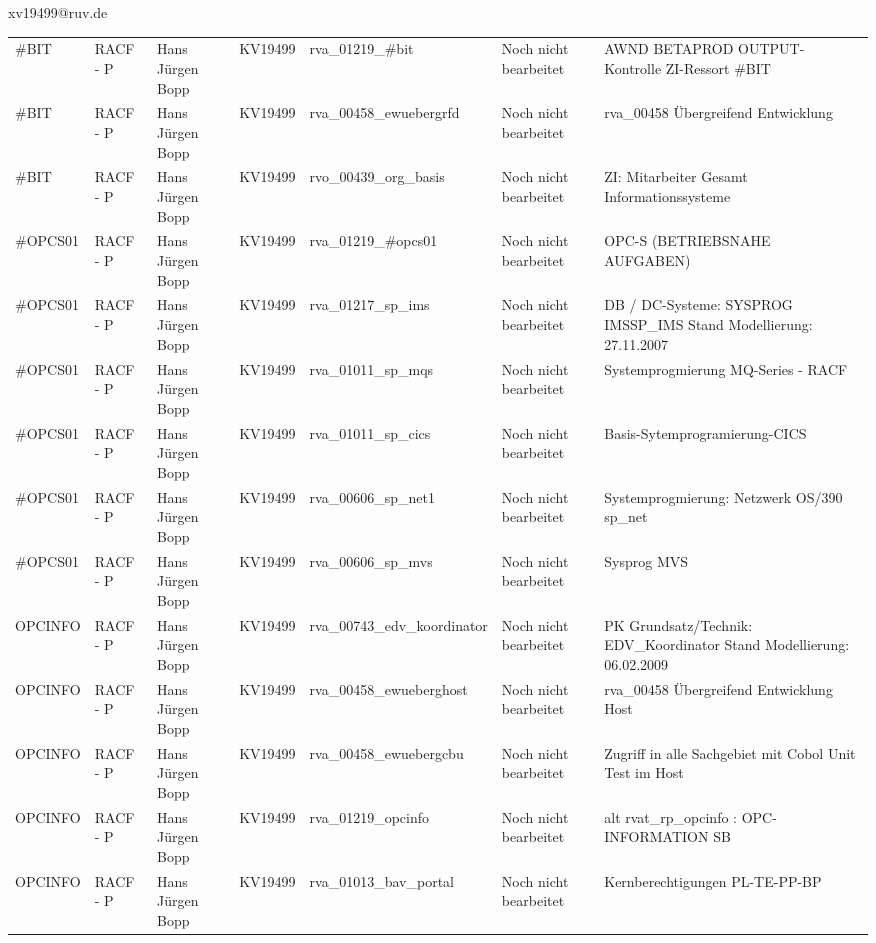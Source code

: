 \documentclass[a4paper,landscape,12pt]{letter}
\begin{document}
\begin{letter}{xv19499@ruv.de\hfill \break}
\begin{tiny}
\begin{longtable}{|p{35mm}|p{15mm}|p{25mm}|p{10mm}|p{40mm}|p{50mm}|p{50mm}|}
\#BIT & RACF - P & Hans Jürgen Bopp & KV19499 & rva\_01219\_\#bit & Noch nicht bearbeitet & AWND BETAPROD OUTPUT-Kontrolle ZI-Ressort \#BIT \\
\#BIT & RACF - P & Hans Jürgen Bopp & KV19499 & rva\_00458\_ewuebergrfd & Noch nicht bearbeitet & rva\_00458 Übergreifend Entwicklung \\
\#BIT & RACF - P & Hans Jürgen Bopp & KV19499 & rvo\_00439\_org\_basis & Noch nicht bearbeitet & ZI: Mitarbeiter Gesamt Informationssysteme \\
\#OPCS01 & RACF - P & Hans Jürgen Bopp & KV19499 & rva\_01219\_\#opcs01 & Noch nicht bearbeitet & OPC-S (BETRIEBSNAHE AUFGABEN) \\
\#OPCS01 & RACF - P & Hans Jürgen Bopp & KV19499 & rva\_01217\_sp\_ims & Noch nicht bearbeitet & DB / DC-Systeme:  SYSPROG IMSSP\_IMS Stand Modellierung: 27.11.2007 \\
\#OPCS01 & RACF - P & Hans Jürgen Bopp & KV19499 & rva\_01011\_sp\_mqs & Noch nicht bearbeitet & Systemprogmierung MQ-Series - RACF \\
\#OPCS01 & RACF - P & Hans Jürgen Bopp & KV19499 & rva\_01011\_sp\_cics & Noch nicht bearbeitet & Basis-Sytemprogramierung-CICS \\
\#OPCS01 & RACF - P & Hans Jürgen Bopp & KV19499 & rva\_00606\_sp\_net1 & Noch nicht bearbeitet & Systemprogmierung: Netzwerk OS/390 sp\_net \\
\#OPCS01 & RACF - P & Hans Jürgen Bopp & KV19499 & rva\_00606\_sp\_mvs & Noch nicht bearbeitet & Sysprog MVS \\
OPCINFO & RACF - P & Hans Jürgen Bopp & KV19499 & rva\_00743\_edv\_koordinator & Noch nicht bearbeitet & PK Grundsatz/Technik: EDV\_Koordinator Stand Modellierung: 06.02.2009 \\
OPCINFO & RACF - P & Hans Jürgen Bopp & KV19499 & rva\_00458\_ewueberghost & Noch nicht bearbeitet & rva\_00458 Übergreifend Entwicklung Host \\
OPCINFO & RACF - P & Hans Jürgen Bopp & KV19499 & rva\_00458\_ewuebergcbu & Noch nicht bearbeitet & Zugriff in alle Sachgebiet mit Cobol Unit Test im Host \\
OPCINFO & RACF - P & Hans Jürgen Bopp & KV19499 & rva\_01219\_opcinfo & Noch nicht bearbeitet & alt rvat\_rp\_opcinfo          : OPC- INFORMATION                         SB \\
OPCINFO & RACF - P & Hans Jürgen Bopp & KV19499 & rva\_01013\_bav\_portal & Noch nicht bearbeitet & Kernberechtigungen PL-TE-PP-BP \\


\end{longtable}
\end{tiny}
\end{letter}
\end{document}
